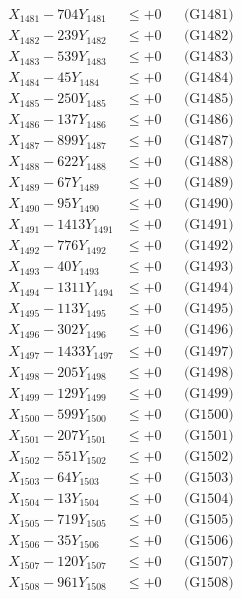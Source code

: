\documentclass[a4paper,10pt]{article}
\begin{document}
{\begin{align}
\allowbreak
X_{1481} - 704Y_{1481} &\leq +0 && \text{(G1481)} \\
X_{1482} - 239Y_{1482} &\leq +0 && \text{(G1482)} \\
X_{1483} - 539Y_{1483} &\leq +0 && \text{(G1483)} \\
X_{1484} - 45Y_{1484} &\leq +0 && \text{(G1484)} \\
X_{1485} - 250Y_{1485} &\leq +0 && \text{(G1485)} \\
X_{1486} - 137Y_{1486} &\leq +0 && \text{(G1486)} \\
X_{1487} - 899Y_{1487} &\leq +0 && \text{(G1487)} \\
X_{1488} - 622Y_{1488} &\leq +0 && \text{(G1488)} \\
X_{1489} - 67Y_{1489} &\leq +0 && \text{(G1489)} \\
X_{1490} - 95Y_{1490} &\leq +0 && \text{(G1490)} \\
\allowbreak
X_{1491} - 1413Y_{1491} &\leq +0 && \text{(G1491)} \\
X_{1492} - 776Y_{1492} &\leq +0 && \text{(G1492)} \\
X_{1493} - 40Y_{1493} &\leq +0 && \text{(G1493)} \\
X_{1494} - 1311Y_{1494} &\leq +0 && \text{(G1494)} \\
X_{1495} - 113Y_{1495} &\leq +0 && \text{(G1495)} \\
X_{1496} - 302Y_{1496} &\leq +0 && \text{(G1496)} \\
X_{1497} - 1433Y_{1497} &\leq +0 && \text{(G1497)} \\
X_{1498} - 205Y_{1498} &\leq +0 && \text{(G1498)} \\
X_{1499} - 129Y_{1499} &\leq +0 && \text{(G1499)} \\
X_{1500} - 599Y_{1500} &\leq +0 && \text{(G1500)} \\
\allowbreak
X_{1501} - 207Y_{1501} &\leq +0 && \text{(G1501)} \\
X_{1502} - 551Y_{1502} &\leq +0 && \text{(G1502)} \\
X_{1503} - 64Y_{1503} &\leq +0 && \text{(G1503)} \\
X_{1504} - 13Y_{1504} &\leq +0 && \text{(G1504)} \\
X_{1505} - 719Y_{1505} &\leq +0 && \text{(G1505)} \\
X_{1506} - 35Y_{1506} &\leq +0 && \text{(G1506)} \\
X_{1507} - 120Y_{1507} &\leq +0 && \text{(G1507)} \\
X_{1508} - 961Y_{1508} &\leq +0 && \text{(G1508)} \\

\end{align}}
\end{document}
